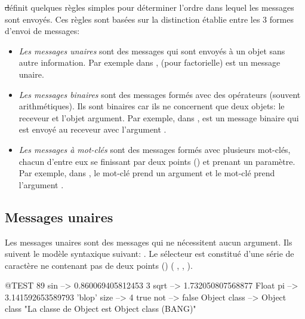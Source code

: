 \documentclass[a4paper,10pt,twoside]{book}
\begin{document}
\st d\'efinit quelques r\`egles simples pour d\'eterminer l'ordre dans lequel les messages sont envoy\'es. Ces r\`egles sont bas\'ees sur la distinction \'etablie entre les 3 formes d'envoi de messages: 
\begin{itemize}
\item \emph{Les messages unaires} sont des messages qui sont envoy\'es
  \`a un objet sans autre information. Par exemple dans ,  (pour factorielle) est un message unaire. 
\item  \emph{Les messages binaires} sont des messages form\'es avec
  des op\'erateurs (souvent arithm\'etiques). Ils sont binaires car
  ils ne concernent que deux objets: le receveur et l'objet
  argument. Par exemple, dans , \ct{+} est un message
  binaire qui est envoy\'e au receveur  avec l'argument . 
\item  \emph{Les messages \`a mot-cl\'es} sont des messages form\'es avec plusieurs mot-cl\'es, chacun d'entre eux se finissant par deux points (\ct{:}) et prenant un param\`etre.
Par exemple, dans , le mot-cl\'e 
prend un argument  et le mot-cl\'e  prend l'argument .
\end{itemize}

\subsection{Messages unaires}
Les messages unaires sont des messages qui ne n\'ecessitent aucun
argument. Ils suivent le mod\`ele syntaxique suivant: . Le s\'electeur est constitu\'e d'une s\'erie de
caract\`ere ne contenant pas de deux points (\ct{:}) (\eg
{}, , ).
\begin{code}{@TEST}
89 sin           --> 0.860069405812453
3 sqrt           --> 1.732050807568877
Float pi         --> 3.141592653589793
'blop' size     --> 4
true not        --> false
Object class --> Object class  "La classe de Object est Object class (BANG)"
\end{code}


\end{document}
